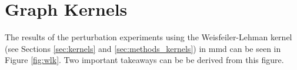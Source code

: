 





\section{Graph Kernels}\label{sec:results_graph_kernels}

The results of the perturbation experiments using the Weisfeiler-Lehman kernel
(see Sections \ref{sec:kernels} and \ref{sec:methods_kernels}) in \gls{mmd} can be
seen in Figure \ref{fig:wlk}. Two important takeaways can be be derived from
this figure.

